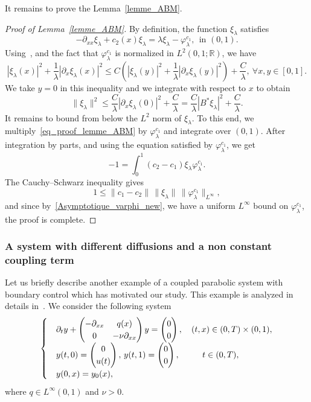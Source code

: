 \documentclass[AHL,Unicode,longabstracts]{cedram}
\newcommand{\fprop}[2]{\varphi^{#1}_{#2}}
\newcommand{\R}{\mathbb{R}}
\let\oldforall\forall
\renewcommand*{\forall}{\mathrel{\oldforall}}
\begin{document}
It remains to prove the Lemma~\ref{lemme_ABM}.
\begin{proof}[Proof of Lemma~\ref{lemme_ABM}]
By definition, the function $\xi_\lambda$ satisfies
\begin{equation}\label{eq_proof_lemme_ABM}
-\partial_{xx}\xi_\lambda + c_2(x) \xi_\lambda = \lambda \xi_\lambda - \fprop{c_1}{\lambda}, \ \ \text{in $(0,1)$}.
\end{equation}
Using~\cite[Lemmas~2.2 and 2.3]{ABM_2018}, and the fact that $\fprop{c_1}{\lambda}$ is normalized in $L^2(0,1;\R)$, we have
\[
|\xi_\lambda(x)|^2 + \frac{1}{\lambda} |\partial_x \xi_\lambda(x)|^2 \leq C \left(|\xi_\lambda(y)|^2 + \frac{1}{\lambda} |\partial_x \xi_\lambda(y)|^2\right) + \frac{C}{\lambda}, \ \forall x,y\in [0,1].
\]
We take $y=0$ in this inequality and we integrate with respect to $x$ to obtain
\[
\|\xi_\lambda\|^2 \leq \frac{C}{\lambda} |\partial_x \xi_\lambda(0)|^2 + \frac{C}{\lambda} = \frac{C}{\lambda} |B^*\xi_\lambda|^2 + \frac{C}{\lambda}.
\]
It remains to bound from below the $L^2$ norm of $\xi_\lambda$. To this end, we multiply~\eqref{eq_proof_lemme_ABM} by $\fprop{c_1}{\lambda}$ and integrate over $(0,1)$. After integration by parts, and using the equation satisfied by $\fprop{c_1}{\lambda}$, we get
\[
-1 = \int_0^1 (c_2-c_1) \xi_\lambda \fprop{c_1}{\lambda}.
\]
The Cauchy--Schwarz inequality gives
\[
1\leq \|c_1-c_2\|\,\|\xi_\lambda\|\,\|\fprop{c_1}{\lambda}\|_{L^\infty},
\]
and since by~\eqref{Asymptotique_varphi_new}, we have a uniform $L^\infty$ bound on $\fprop{c_1}{\lambda}$, the proof is complete.
\end{proof}

\subsubsection{A system with different diffusions and a non constant coupling term}

Let us briefly describe another example of a coupled parabolic system with boundary control which has motivated our study. This example is analyzed in details in~\cite{Samb18}. We consider the following system
\begin{equation}\label{systeme_elhadji}
\begin{cases}
& \partial_t y +
\begin{pmatrix} - \partial_{xx} & q(x) \\ 0 & - \nu \partial_{xx}
\end{pmatrix} y =
\begin{pmatrix} 0 \\ 0
\end{pmatrix},
\quad (t,x) \in (0,T) \times (0,1),
\\
&y(t,0) =
\begin{pmatrix} 0 \\ u(t)
\end{pmatrix},\, y(t,1) =
\begin{pmatrix} 0 \\ 0
\end{pmatrix}, \mkern 48mu t\in (0,T),
\\[0.15em]
&y(0,x) = y_0(x),
\end{cases}
\end{equation}
where $q\in L^\infty(0,1)$ and $\nu>0$.
\end{document}
